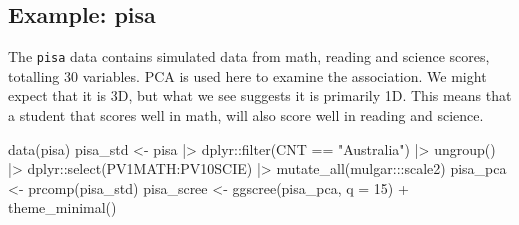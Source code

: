 \documentclass[
  letterpaper,
]{krantz}
\newenvironment{Shaded}{\begin{snugshade}}{\end{snugshade}}
\newcommand{\AttributeTok}[1]{\textcolor[rgb]{0.40,0.45,0.13}{#1}}
\newcommand{\DecValTok}[1]{\textcolor[rgb]{0.68,0.00,0.00}{#1}}
\newcommand{\FunctionTok}[1]{\textcolor[rgb]{0.28,0.35,0.67}{#1}}
\newcommand{\NormalTok}[1]{\textcolor[rgb]{0.00,0.23,0.31}{#1}}
\newcommand{\OtherTok}[1]{\textcolor[rgb]{0.00,0.23,0.31}{#1}}
\newcommand{\SpecialCharTok}[1]{\textcolor[rgb]{0.37,0.37,0.37}{#1}}
\newcommand{\StringTok}[1]{\textcolor[rgb]{0.13,0.47,0.30}{#1}}
\begin{document}
\begin{table}

\caption{\label{tbl-plane-noise-pcs}Coefficients for PCs 1-4 of the
plane plus noise data.}


\end{table}%

\subsection{Example: pisa}\label{example-pisa}


The \texttt{pisa} data contains simulated data from math, reading and
science scores, totalling 30 variables. PCA is used here to examine the
association. We might expect that it is 3D, but what we see suggests it
is primarily 1D. This means that a student that scores well in math,
will also score well in reading and science.

\begin{Shaded}
\begin{Highlighting}[]
\FunctionTok{data}\NormalTok{(pisa)}
\NormalTok{pisa\_std }\OtherTok{\textless{}{-}}\NormalTok{ pisa }\SpecialCharTok{|\textgreater{}}
\NormalTok{  dplyr}\SpecialCharTok{::}\FunctionTok{filter}\NormalTok{(CNT }\SpecialCharTok{==} \StringTok{"Australia"}\NormalTok{) }\SpecialCharTok{|\textgreater{}}
  \FunctionTok{ungroup}\NormalTok{() }\SpecialCharTok{|\textgreater{}}
\NormalTok{  dplyr}\SpecialCharTok{::}\FunctionTok{select}\NormalTok{(PV1MATH}\SpecialCharTok{:}\NormalTok{PV10SCIE) }\SpecialCharTok{|\textgreater{}}
  \FunctionTok{mutate\_all}\NormalTok{(mulgar}\SpecialCharTok{:::}\NormalTok{scale2)}
\NormalTok{pisa\_pca }\OtherTok{\textless{}{-}} \FunctionTok{prcomp}\NormalTok{(pisa\_std)}
\NormalTok{pisa\_scree }\OtherTok{\textless{}{-}} \FunctionTok{ggscree}\NormalTok{(pisa\_pca, }\AttributeTok{q =} \DecValTok{15}\NormalTok{) }\SpecialCharTok{+} \FunctionTok{theme\_minimal}\NormalTok{()}
\end{Highlighting}
\end{Shaded}
\end{document}
